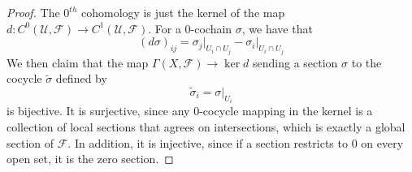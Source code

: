 \documentclass[psamsfonts, 12pt]{amsart}
\theoremstyle{definition}
\theoremstyle{remark}
\begin{document}
%
\begin{proof}
The $0^{th}$ cohomology is just the kernel of the map
$d : C^0(\mathcal{U},\mathcal{F}) \to C^1(\mathcal{U}, \mathcal{F})$.
For a $0$-cochain $\sigma$, we have that
\[
(d\sigma)_{ij} = \sigma_j\vert_{U_i \cap U_j} - \sigma_i\vert_{U_i \cap U_j}
\]
We then claim that the map $\Gamma(X, \mathcal{F}) \to \ker d$ sending a section
$\sigma$ to the cocycle $\tilde{\sigma}$ defined by
\[
\tilde{\sigma}_i = \sigma\vert_{U_i}
\]
is bijective. It is surjective, since any $0$-cocycle mapping in the kernel
is a collection of local sections that agrees on intersections, which is exactly
a global section of $\mathcal{F}$. In addition, it is injective, since if
a section restricts to $0$ on every open set, it is the zero section.
\end{proof}
%
%
\end{document}
